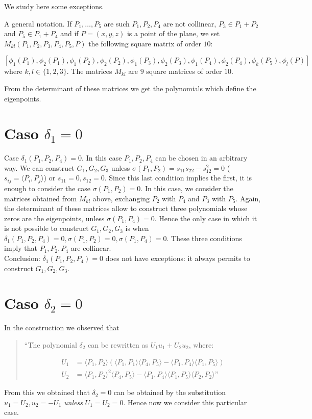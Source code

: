 \documentclass{amsart}
\theoremstyle{plain}
\theoremstyle{definition}
\newcommand{\scl}[2]{\langle #1, #2 \rangle}
\begin{document}
We study here some exceptions.

A general notation. If $P_1, \dots, P_5$ are such $P_1, P_2, P_4$ are
not collinear, $P_3 \in P_1+P_2$ and $P_5\in P_1+P_4$ and if $P=(x, y, z)$ is
a point of the plane, we set $M_{kl}(P_1, P_2, P_3, P_4, P_5, P)$ the
following square matrix of order $10$:

\[
  [\phi_1(P_1), \phi_2(P_1), \phi_1(P_2), \phi_2(P_2),
  \phi_1(P_3), \phi_2(P_3), \phi_1(P_4), \phi_2(P_4), \phi_k(P_5), \phi_l(P)]
\]
where $k, l \in \{1, 2, 3\}$.
The matrices $M_{kl}$ are $9$ square matrices of order $10$. 

{From} the determinant of these matrices we get the polynomials which
define the eigenpoints.

\section{Caso $\delta_1=0$}

Case $\delta_1(P_1, P_2, P_4) = 0$. In this case $P_1, P_2, P_4$ can be
chosen in an arbitrary way. We can construct
$G_1, G_2, G_3$ unless $\sigma(P_1, P_2) = s_{11}s_{22}-s_{12}^2 = 0$
($s_{ij} = \scl{P_i}{P_j}$)
or $s_{11} = 0, s_{12} = 0$. Since this last condition implies the first,
it is enough to consider the case $\sigma(P_1, P_2) = 0$.
In this case, we consider the matrices obtained from $M_{kl}$ above,
exchanging $P_2$ with $P_4$ and $P_3$ with $P_5$. Again, the determinant
of these matrices allow to construct three polynomials whose zeros are
the eigenpoints, unless $\sigma(P_1, P_4) = 0$. Hence the only case in
which it is not possible to construct $G_1, G_2, G_3$ is when
$\delta_1(P_1, P_2, P_4) = 0, \sigma(P_1, P_2) = 0, \sigma (P_1, P_4)=0$.
These three conditions imply that $P_1, P_2, P_4$ are collinear.\\
Conclusion: $\delta_1(P_1, P_2, P_4) = 0$ does not have exceptions: it
always permits to construct $G_1, G_2, G_3$.

\bigskip

\section{Caso $\delta_2=0$} In the construction we observed that

\begin{quote}
``The polynomial $\delta_2$ can be rewritten as
$U_1u_1+U_2u_2$, where:

\begin{equation}
  \begin{split}
    U_1 & =  \langle P_1, P_2\rangle \left(\langle P_1, P_1\rangle
  \langle P_4,P_5\rangle - \langle P_1, P_4\rangle \langle P_1, P_5\rangle
  \right)\\
  U_2 & =  \langle P_1, P_2\rangle^2\langle P_4, P_5\rangle
  -\langle P_1, P_4\rangle \langle P_1, P_5\rangle \langle P_2, P_2\rangle
  \mbox{''}
  \label{sst2}
  \end{split}
\end{equation}
\end{quote}
{From} this we obtained that $\delta_2 = 0$ can be obtained by the
substitution $u_1 = U_2, u_2 = -U_1$ \emph{unless} $U_1 = U_2 = 0$.
Hence now we consider this particular case.
\end{document}
